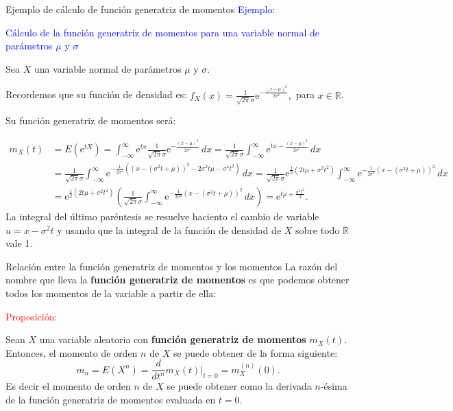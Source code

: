 \documentclass[
  ignorenonframetext,
  aspectratio=169]{beamer}
\newcommand\blue[1]{\textcolor{blue}{#1}}
\newcommand\red[1]{\textcolor{red}{#1}}
\begin{document}
\begin{frame}{Ejemplo de cálculo de función generatriz de momentos}
\protect\hypertarget{ejemplo-de-cuxe1lculo-de-funciuxf3n-generatriz-de-momentos-2}{}
\blue{Ejemplo:}

\blue{Cálculo de la función generatriz de momentos para una variable normal de parámetros $\mu$ y $\sigma$}

Sea \(X\) una variable normal de parámetros \(\mu\) y \(\sigma\).

Recordemos que su función de densidad es:
\(f_X(x)=\frac{1}{\sqrt{2\pi}\sigma}\mathrm{e}^{-\frac{(x-\mu)^2}{2\sigma^2}},\)
para \(x\in \mathbb{R}\).

Su función generatriz de momentos será:

\[
\begin{array}{rl}
m_X (t) & =E\left(\mathrm{e}^{tX}\right)=\int_{-\infty}^\infty \mathrm{e}^{tx}\frac{1}{\sqrt{2\pi}\sigma}\mathrm{e}^{-\frac{(x-\mu)^2}{2\sigma^2}}\, dx = \frac{1}{\sqrt{2\pi}\sigma} \int_{-\infty}^\infty \mathrm{e}^{tx-\frac{(x-\mu)^2}{2\sigma^2}}\, dx \\  & =  \frac{1}{\sqrt{2\pi}\sigma} \int_{-\infty}^\infty \mathrm{e}^{-\frac{1}{2\sigma^2}\left((x-(\sigma^2 t+\mu))^2-2\sigma^2 t \mu-\sigma^4t^2\right)}\, dx = \frac{1}{\sqrt{2\pi}\sigma} \mathrm{e}^{\frac{1}{2}(2 t \mu +\sigma^2 t^2)}\int_{-\infty}^\infty \mathrm{e}^{-\frac{1}{2\sigma^2}(x-(\sigma^2 t+\mu))^2}\, dx\\ &  = \mathrm{e}^{\frac{1}{2}(2 t \mu +\sigma^2 t^2)} \left( \frac{1}{\sqrt{2\pi}\sigma} \int_{-\infty}^\infty \mathrm{e}^{-\frac{1}{2\sigma^2}(x-(\sigma^2 t+\mu))^2}\, dx\right) =  \mathrm{e}^{ t \mu +\frac{\sigma^2 t^2}{2}}.
\end{array}
\] La integral del último paréntesis se resuelve haciento el cambio de
variable \(u=x-\sigma^2 t\) y usando que la integral de la función de
densidad de \(X\) sobre todo \(\mathbb{R}\) vale 1.
\end{frame}

\begin{frame}{Relación entre la función generatriz de momentos y los
momentos}
\protect\hypertarget{relaciuxf3n-entre-la-funciuxf3n-generatriz-de-momentos-y-los-momentos}{}
La razón del nombre que lleva la \textbf{función generatriz de momentos}
es que podemos obtener todos los momentos de la variable a partir de
ella:

\red{Proposición:}

Sean \(X\) una variable aleatoria con \textbf{función generatriz de
momentos} \(m_X(t)\). Entonces, el momento de orden \(n\) de \(X\) se
puede obtener de la forma siguiente: \[
m_n =E\left(X^n\right)=\frac{d}{d t^n}m_X(t)|_{t=0} =m_X^{(n)}(0).
\] Es decir el momento de orden \(n\) de \(X\) se puede obtener como la
derivada \(n\)-ésima de la función generatriz de momentos evaluada en
\(t=0\).
\end{frame}
\end{document}
